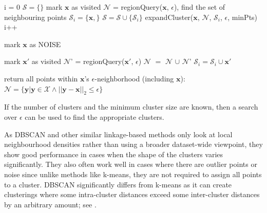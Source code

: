 \documentclass[../thesis.tex]{subfiles}
\begin{document}
\begin{algorithm}
\caption{An abstract description of DBSCAN}\label{alg__DMS__dbscan}

\begin{algorithmic}
\State i = 0
\State $\mathbf{\mathcal{S}} = \{\}$
    \State mark $\mathbf{x}$ as visited
    \State $\mathbf{\mathcal{N}}$ = regionQuery($\mathbf{x}$, $\epsilon$), find the set of neighbouring points
        \State $\mathbf{\mathcal{S}}_i = \{\mathbf{x} ,\}$
        \State $\mathbf{\mathcal{S}} = \mathcal{S} \cup \{\mathbf{\mathcal{S}}_i\}$
        \State expandCluster($\mathbf{x}$, $\mathbf{\mathcal{N}}$, $\mathbf{\mathcal{S}}_i$, $\epsilon$, minPts)
        \State i++

    \Else
        \State mark $\mathbf{x}$ as NOISE
    \EndIf
\EndFor
\EndFunction
\item[]

    \State mark $\mathbf{x}'$ as visited
    \State $\mathbf{\mathcal{N}}$' = regionQuery($\mathbf{x}'$, $\epsilon$)
            \State $\mathbf{\mathcal{N}}$ $=$ $\mathbf{\mathcal{N}}$ $\cup$ $\mathbf{\mathcal{N}}$'
        \EndIf
    \EndIf
    \State $\mathbf{\mathcal{S}}_i = \mathbf{\mathcal{S}}_i \cup \mathbf{x}'$
    \EndIf
\EndFor
\EndFunction
\item[]
\State return all points within $\mathbf{x}$'s $\epsilon$-neighborhood (including $\mathbf{x}$):
\State $\mathbf{\mathcal{N}} = \{\mathbf{y}| \mathbf{y} \in \mathbf{\mathcal{X}} \land ||\mathbf{y} - \mathbf{x}||_2 \leq \epsilon\}$  
 
\EndFunction

\end{algorithmic}
\end{algorithm}




If the number of clusters and the minimum cluster size are known, then a search over $\epsilon$ can be used to find the appropriate clusters.

As DBSCAN and other similar linkage-based methods only look at local neighbourhood densities rather than using a broader dataset-wide viewpoint, they show good performance in cases when the shape of the clusters varies significantly.
They also often work well in cases where there are outlier points or noise since unlike methods like k-means, they are not required to assign all points to a cluster. 
DBSCAN significantly differs from k-means as it can create clusterings where some intra-cluster distances exceed some inter-cluster distances by an arbitrary amount; see .
\end{document}
